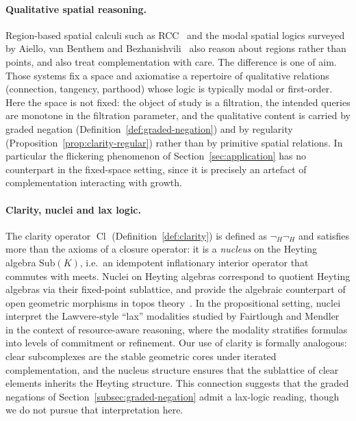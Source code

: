 \documentclass[final,12pt]{elsarticle}
\theoremstyle{plain}
\theoremstyle{definition}
\begin{document}
\paragraph{Qualitative spatial reasoning.}
Region-based spatial calculi such as RCC~\cite{randell1992} and the
modal spatial logics surveyed by Aiello, van Benthem and
Bezhanishvili~\cite{aiello2003} also reason about regions rather than points,
and also treat complementation with care. The difference is one of aim. Those
systems fix a space and axiomatise a repertoire of qualitative relations
(connection, tangency, parthood) whose logic is typically modal or
first-order. Here the space is not fixed: the object of study is a filtration,
the intended queries are monotone in the filtration parameter, and the
qualitative content is carried by graded negation
(Definition~\ref{def:graded-negation}) and by regularity
(Proposition~\ref{prop:clarity-regular}) rather than by primitive spatial
relations. In particular the flickering phenomenon of
Section~\ref{sec:application} has no counterpart in the fixed-space setting,
since it is precisely an artefact of complementation interacting with growth.

\paragraph{Clarity, nuclei and lax logic.}
The clarity operator \(\mathop{\mathrm{Cl}}\) (Definition~\ref{def:clarity})
is defined as \(\neg_H\neg_H\) and satisfies more than the axioms of a closure
operator: it is a \emph{nucleus} on the Heyting algebra \(\mathrm{Sub}(K)\),
i.e.\ an idempotent inflationary interior operator that commutes with meets.
Nuclei on Heyting algebras correspond to quotient Heyting algebras via their
fixed-point sublattice, and provide the algebraic counterpart of open
geometric morphisms in topos theory~\cite{johnstone1982}. In the propositional
setting, nuclei interpret the Lawvere-style ``lax'' modalities studied by
Fairtlough and Mendler~\cite{fairtlough1997} in the context of resource-aware
reasoning, where the modality stratifies formulas into levels of commitment or
refinement. Our use of clarity is formally analogous: clear subcomplexes are
the stable geometric cores under iterated complementation, and the nucleus
structure ensures that the sublattice of clear elements inherits the Heyting
structure. This connection suggests that the graded negations of
Section~\ref{subsec:graded-negation} admit a lax-logic reading, though we do not pursue
that interpretation here.
\end{document}
